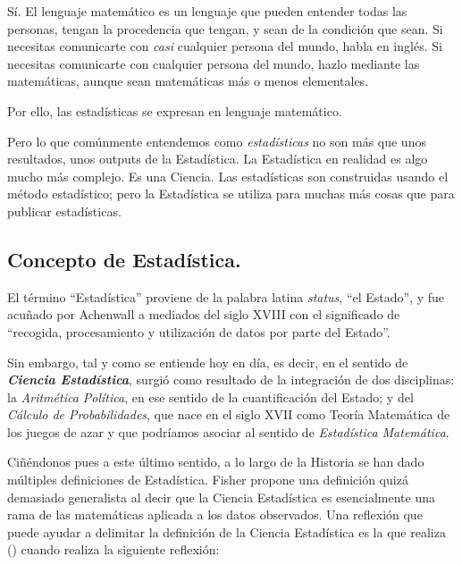 \documentclass[
]{book}
\begin{document}
Sí. El lenguaje matemático es un lenguaje que pueden entender todas las personas, tengan la procedencia que tengan, y sean de la condición que sean. Si necesitas comunicarte con \emph{casi} cualquier persona del mundo, habla en inglés. Si necesitas comunicarte con cualquier persona del mundo, hazlo mediante las matemáticas, aunque sean matemáticas más o menos elementales.

Por ello, las estadísticas se expresan en lenguaje matemático.

Pero lo que comúnmente entendemos como \emph{estadísticas} no son más que unos resultados, unos outputs de la Estadística. La Estadística en realidad es algo mucho más complejo. Es una Ciencia. Las estadísticas son construidas usando el método estadístico; pero la Estadística se utiliza para muchas más cosas que para publicar estadísticas.

\subsection{Concepto de Estadística.}\label{concepto-de-estaduxedstica.}

El término ``Estadística'' proviene de la palabra latina \emph{status}, ``el Estado'', y fue acuñado por Achenwall a mediados del siglo XVIII con el significado de ``recogida, procesamiento y utilización de datos por parte del Estado''.

Sin embargo, tal y como se entiende hoy en día, es decir, en el sentido de \textbf{\emph{Ciencia Estadística}}, surgió como resultado de la integración de dos disciplinas: la \emph{Aritmética Política}, en ese sentido de la cuantificación del Estado; y del \emph{Cálculo de Probabilidades}, que nace en el siglo XVII como Teoría Matemática de los juegos de azar y que podríamos asociar al sentido de \emph{Estadística Matemática}.

Ciñéndonos pues a este último sentido, a lo largo de la Historia se han dado múltiples definiciones de Estadística. Fisher propone una definición quizá demasiado generalista al decir que la Ciencia Estadística es esencialmente una rama de las matemáticas aplicada a los datos observados. Una reflexión que puede ayudar a delimitar la definición de la Ciencia Estadística es la que realiza () cuando realiza la siguiente reflexión:
\end{document}
